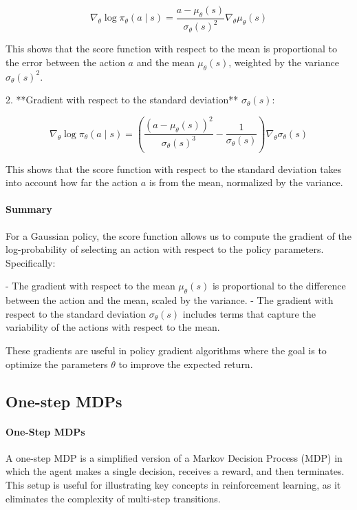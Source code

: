 \documentclass[10pt, oneside]{article}
\theoremstyle{definition}
\begin{document}
\[
\nabla_\theta \log \pi_\theta(a \mid s) = \frac{a - \mu_\theta(s)}{\sigma_\theta(s)^2} \nabla_\theta \mu_\theta(s)
\]

This shows that the score function with respect to the mean is proportional to the error between the action $a$ and the mean $\mu_\theta(s)$, weighted by the variance $\sigma_\theta(s)^2$.

2. **Gradient with respect to the standard deviation** $\sigma_\theta(s)$:
   
\[
\nabla_\theta \log \pi_\theta(a \mid s) = \left( \frac{(a - \mu_\theta(s))^2}{\sigma_\theta(s)^3} - \frac{1}{\sigma_\theta(s)} \right) \nabla_\theta \sigma_\theta(s)
\]

This shows that the score function with respect to the standard deviation takes into account how far the action $a$ is from the mean, normalized by the variance.

\paragraph{Summary}

For a Gaussian policy, the score function allows us to compute the gradient of the log-probability of selecting an action with respect to the policy parameters. Specifically:

- The gradient with respect to the mean $\mu_\theta(s)$ is proportional to the difference between the action and the mean, scaled by the variance.
- The gradient with respect to the standard deviation $\sigma_\theta(s)$ includes terms that capture the variability of the actions with respect to the mean.

These gradients are useful in policy gradient algorithms where the goal is to optimize the parameters $\theta$ to improve the expected return.

\subsection{One-step MDPs}

\paragraph{One-Step MDPs}

A one-step MDP is a simplified version of a Markov Decision Process (MDP) in which the agent makes a single decision, receives a reward, and then terminates. This setup is useful for illustrating key concepts in reinforcement learning, as it eliminates the complexity of multi-step transitions. 
\end{document}
